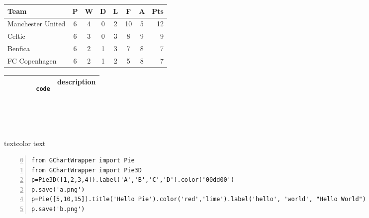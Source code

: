 \documentclass{ctexart}
\begin{document}
\begin{CJK*}{GBK}{song}
\begin{tabular}{l*{6}{c}r}
Team              & P & W & D & L & F  & A & Pts \\
\hline
Manchester United & 6 & 4 & 0 & 2 & 10 & 5 & 12  \\
Celtic            & 6 & 3 & 0 & 3 &  8 & 9 &  9  \\
Benfica           & 6 & 2 & 1 & 3 &  7 & 8 &  7  \\
FC Copenhagen     & 6 & 2 & 1 & 2 &  5 & 8 &  7  \\
\end{tabular}


\begin{tabular}{| p{5cm} | c |}
        \hline
        \begin{verbatim}
        code
        \end{verbatim}
        & description
        \\ \hline
\end{tabular}
\\
\\
\\
\textcolor[rgb]{0.69,0.94,0.71}{textcolor text}

\renewcommand{\ttdefault}{pcr}

\begin{lstlisting}[frame=single,
                    framerule=1pt,
                    numbers=left,
                    firstnumber=0,
                    caption={Sample python source code},]
from GChartWrapper import Pie
from GChartWrapper import Pie3D
p=Pie3D([1,2,3,4]).label('A','B','C','D').color('00dd00')
p.save('a.png')
p=Pie([5,10,15]).title('Hello Pie').color('red','lime').label('hello', 'world', "Hello World")
p.save('b.png')
\end{lstlisting}



\end{CJK*}
\end{document}
